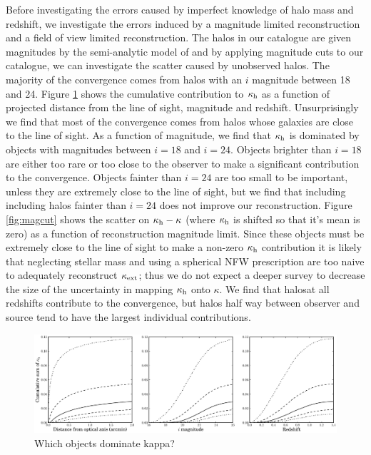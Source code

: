 \documentclass[useAMS,usenatbib]{mn2e}
\begin{document}
Before investigating the errors caused by imperfect knowledge of halo mass and redshift, we investigate the errors induced by a magnitude limited reconstruction and a field of view limited reconstruction. The halos in our catalogue are given magnitudes by the semi-analytic model of \citet{deLucia+Blaizot2007} and by applying magnitude cuts to our catalogue, we can investigate the scatter caused by unobserved halos. The majority of the convergence comes from halos with an $i$ magnitude between 18 and 24. Figure \ref{fig:where} shows the cumulative contribution to $\kappa_{\rm h}$ as a function of projected distance from the line of sight, magnitude and redshift. Unsurprisingly we find that most of the convergence comes from halos whose galaxies are close to the line of sight. As a function of magnitude, we find that $\kappa_{\rm h}$ is dominated by objects with magnitudes between $i=18$ and $i=24$. Objects brighter than $i=18$ are either too rare or too close to the observer to make a significant contribution to the convergence. Objects fainter than $i=24$ are too small to be important, unless they are extremely close to the line of sight, but we find that including including halos fainter than $i=24$ does not improve our reconstruction. Figure \ref{fig:magcut} shows the scatter on $\kappa_{\rm h}-\kappa$ (where $\kappa_{\rm h}$ is shifted so that it's mean is zero) as a function of reconstruction magnitude limit. Since these objects must be extremely close to the line of sight to make a non-zero $\kappa_{\rm h}$ contribution it is likely that neglecting stellar mass and using a spherical NFW prescription are too naive to adequately reconstruct $\kappa_{\rm ext}$; thus we do not expect a deeper survey to decrease the size of the uncertainty in mapping $\kappa_{\rm h}$ onto $\kappa$. We find that halosat all redshifts contribute to the convergence, but halos half way between observer and source tend to have the largest individual contributions.  


\begin{figure}
\includegraphics[width=\textwidth]{figs/where_is_the_kappa.eps}
\caption[magcut]{Which objects dominate kappa?}
\label{fig:where}
\end{figure}
\end{document}
